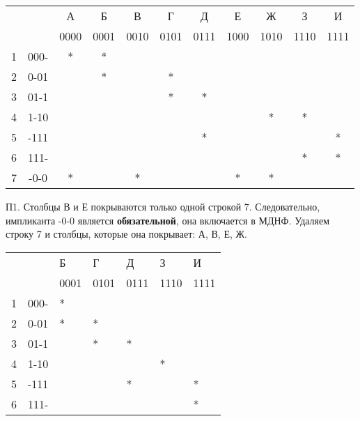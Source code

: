 \documentclass{article}
\begin{document}
	\begin{table}[ht]
		\centering
		\begin{tabular}{|cc|c|c|c|c|c|c|c|c|c|}
			\hline
			\multicolumn{2}{|c|}{\multirow{2}{*}{}} & А    & Б    & В    & Г    & Д    & Е    & Ж    & З    & И    \\ \cline{3-11} 
			\multicolumn{2}{|c|}{}                  & 0000 & 0001 & 0010 & 0101 & 0111 & 1000 & 1010 & 1110 & 1111 \\ \hline
			\multicolumn{1}{|c|}{1}      & 000-     & *    & *    &      &      &      &      &      &      &      \\ \hline
			\multicolumn{1}{|c|}{2}      & 0-01     &      & *    &      & *    &      &      &      &      &      \\ \hline
			\multicolumn{1}{|c|}{3}      & 01-1     &      &      &      & *    & *    &      &      &      &      \\ \hline
			\multicolumn{1}{|c|}{4}      & 1-10     &      &      &      &      &      &      & *    & *    &      \\ \hline
			\multicolumn{1}{|c|}{5}      & -111     &      &      &      &      & *    &      &      &      & *    \\ \hline
			\multicolumn{1}{|c|}{6}      & 111-     &      &      &      &      &      &      &      & *    & *    \\ \hline
			\multicolumn{1}{|c|}{7}      & -0-0     & *    &      & *    &      &      & *    & *    &      &      \\ \hline
		\end{tabular}
	\end{table}
	
	П1. Столбцы В и Е покрываются только одной строкой 7. Следовательно, импликанта -0-0 является \textbf{обязательной},
	она включается в МДНФ. Удаляем строку 7 и столбцы, которые она покрывает: А, В, Е, Ж.
	
	\begin{table}[ht]
		\centering
		\begin{tabular}{|ll|l|l|l|l|l|}
			\hline
			\multicolumn{2}{|l|}{\multirow{2}{*}{}} & Б    & Г    & Д    & З    & И    \\ \cline{3-7} 
			\multicolumn{2}{|l|}{}                  & 0001 & 0101 & 0111 & 1110 & 1111 \\ \hline
			\multicolumn{1}{|l|}{1}      & 000-     & *    &      &      &      &      \\ \hline
			\multicolumn{1}{|l|}{2}      & 0-01     & *    & *    &      &      &      \\ \hline
			\multicolumn{1}{|l|}{3}      & 01-1     &      & *    & *    &      &      \\ \hline
			\multicolumn{1}{|l|}{4}      & 1-10     &      &      &      & *    &      \\ \hline
			\multicolumn{1}{|l|}{5}      & -111     &      &      & *    &      & *    \\ \hline
			\multicolumn{1}{|l|}{6}      & 111-     &      &      &      &      & *    \\ \hline
		\end{tabular}
	\end{table}
	
\end{document}
